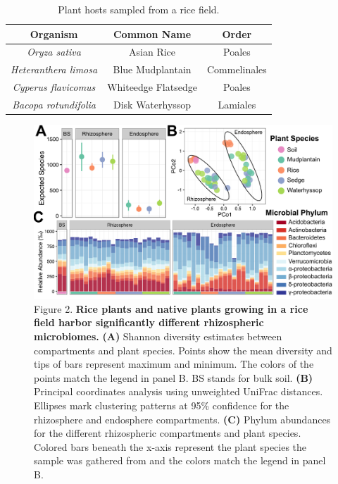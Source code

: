 \begin{table}[ht]
\centering
\small
{}
\caption[Table 3.2]{Plant hosts sampled from a rice field.}
\begin{tabular}{c|cc}
\hline
\textbf{Organism}& \textbf{Common Name} & \textbf{Order} \\
\hline
\rowcolor{Gray}
\textit{Oryza sativa}& Asian Rice & Poales \\
\textit{Heteranthera limosa}& Blue Mudplantain & Commelinales \\
\rowcolor{Gray}
\textit{Cyperus flavicomus}& Whiteedge Flatsedge & Poales \\
\textit{Bacopa rotundifolia}& Disk Waterhyssop & Lamiales \\
\hline
\end{tabular}
\end{table}

\begin{figure}[h]
\centering
\includegraphics[width=6in]{Figures/figure2_2}
\caption[Figure 3.2]{Figure 2. \textbf{Rice plants and native plants growing in a rice field harbor significantly different rhizospheric microbiomes.} \textbf{(A)} Shannon diversity estimates between compartments and plant species. Points show the mean diversity and tips of bars represent maximum and minimum. The colors of the points match the legend in panel B. BS stands for bulk soil. \textbf{(B)} Principal coordinates analysis using unweighted UniFrac distances. Ellipses mark clustering patterns at 95\% confidence for the rhizosphere and endosphere compartments. \textbf{(C)} Phylum abundances for the different rhizospheric compartments and plant species. Colored bars beneath the x-axis represent the plant species the sample was gathered from and the colors match the legend in panel B.
}
\label{Figure 3.2}
\end{figure}

